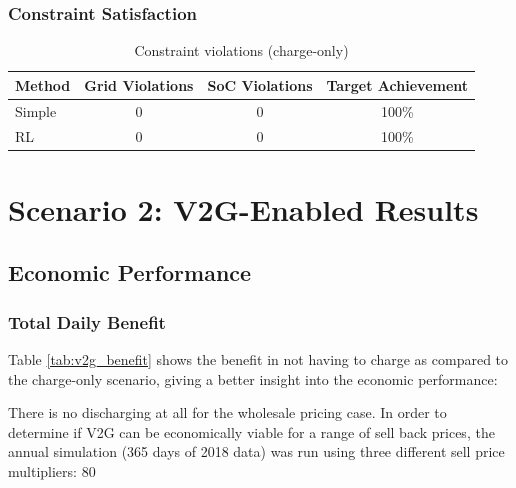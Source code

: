 \subsubsection{Constraint Satisfaction}
\begin{table}[H]
\centering
\caption{Constraint violations (charge-only)}
\label{tab:charge_only_violations}
\begin{tabular}{@{}lccc@{}}
\toprule
\textbf{Method} & \textbf{Grid Violations} & \textbf{SoC Violations} & \textbf{Target Achievement} \\
\midrule
Simple & 0 & 0 & 100\% \\
RL & 0 & 0 & 100\% \\
\bottomrule
\end{tabular}
\end{table}
\section{Scenario 2: V2G-Enabled Results} \label{sec:v2g_results}
\subsection{Economic Performance} \label{subsec:v2g_economic}
\subsubsection{Total Daily Benefit}
Table \ref{tab:v2g_benefit} shows the benefit in not having to charge as compared to the charge-only scenario, giving a better insight into the economic performance:
\begin{table}[H]
\centering
\caption{Economic comparison for V2G scenario}
\label{tab:v2g_benefit}
\end{table}
There is no discharging at all for the wholesale pricing case. In order to determine if V2G can be economically viable for a range of sell back prices, the annual simulation (365 days of 2018 data) was run using three different sell price multipliers: 80%

